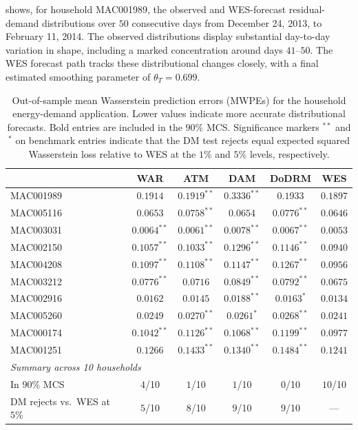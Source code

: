 \documentclass[a4paper, 11pt]{article}
\theoremstyle{definition}
\begin{document}
 shows, for household MAC001989, the observed and WES-forecast residual-demand distributions over $50$ consecutive days from December 24, 2013, to February 11, 2014.
The observed distributions display substantial day-to-day variation in shape, including a marked concentration around days $41$--$50$. 
The WES forecast path tracks these distributional changes closely, with a final estimated smoothing parameter of $\theta_T = 0.699$.

\begin{table}[t]
\centering
\small
\caption{Out-of-sample mean Wasserstein prediction errors (MWPEs) for the household energy-demand application. Lower values indicate more accurate distributional forecasts. Bold entries are included in the $90\%$ MCS. Significance markers $^{\ast\ast}$ and $^{\ast}$ on benchmark entries indicate that the DM test rejects equal expected squared Wasserstein loss relative to WES at the $1\%$ and $5\%$ levels, respectively.}
\label{tab:smart_meter_oos_significance}
\begin{tabular}{lccccc}
\toprule
        & WAR                  & ATM                  & DAM                 & DoDRM                & WES \\
\midrule
MAC001989 & $\mathbf{0.1914}$ & $0.1919^{\ast\ast}$ & $0.3336^{\ast\ast}$ & $0.1933$ & $\mathbf{0.1897}$ \\
MAC005116 & $\mathbf{0.0653}$ & $0.0758^{\ast\ast}$ & $\mathbf{0.0654}$ & $0.0776^{\ast\ast}$ & $\mathbf{0.0646}$ \\
MAC003031 & $0.0064^{\ast\ast}$ & $0.0061^{\ast\ast}$ & $0.0078^{\ast\ast}$ & $0.0067^{\ast\ast}$ & $\mathbf{0.0053}$ \\
MAC002150 & $0.1057^{\ast\ast}$ & $0.1033^{\ast\ast}$ & $0.1296^{\ast\ast}$ & $0.1146^{\ast\ast}$ & $\mathbf{0.0940}$ \\
MAC004208 & $0.1097^{\ast\ast}$ & $0.1108^{\ast\ast}$ & $0.1147^{\ast\ast}$ & $0.1267^{\ast\ast}$ & $\mathbf{0.0956}$ \\
MAC003212 & $0.0776^{\ast\ast}$ & $0.0716$ & $0.0849^{\ast\ast}$ & $0.0792^{\ast\ast}$ & $\mathbf{0.0675}$ \\
MAC002916 & $\mathbf{0.0162}$ & $\mathbf{0.0145}$ & $0.0188^{\ast\ast}$ & $0.0163^{\ast}$ & $\mathbf{0.0134}$ \\
MAC005260 & $\mathbf{0.0249}$ & $0.0270^{\ast\ast}$ & $0.0261^{\ast}$ & $0.0268^{\ast\ast}$ & $\mathbf{0.0241}$ \\
MAC000174 & $0.1042^{\ast\ast}$ & $0.1126^{\ast\ast}$ & $0.1068^{\ast\ast}$ & $0.1199^{\ast\ast}$ & $\mathbf{0.0977}$ \\
MAC001251 & $0.1266$ & $0.1433^{\ast\ast}$ & $0.1340^{\ast\ast}$ & $0.1484^{\ast\ast}$ & $\mathbf{0.1241}$ \\
\midrule
\multicolumn{6}{l}{\emph{Summary across 10 households}} \\
In $90\%$ MCS                & $4$/10 & $1$/10 & $1$/10 & $0$/10 & $10$/10 \\
DM rejects vs.\ WES at $5\%$ & $5$/10 & $8$/10 & $9$/10 & $9$/10 & --- \\
\bottomrule
\end{tabular}
\end{table}
\end{document}
